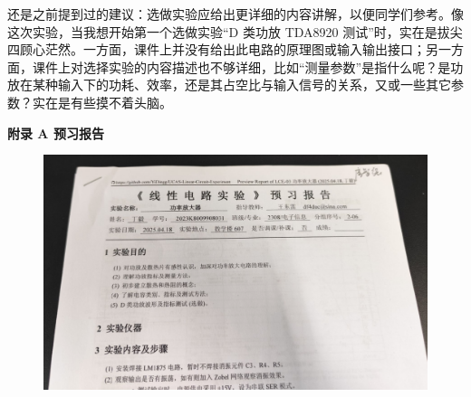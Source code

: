\documentclass[UTF8]{article}
\begin{document}
还是之前提到过的建议：选做实验应给出更详细的内容讲解，以便同学们参考。像这次实验，当我想开始第一个选做实验“D 类功放 TDA8920 测试”时，实在是拔尖四顾心茫然。一方面，课件上并没有给出此电路的原理图或输入输出接口；另一方面，课件上对选择实验的内容描述也不够详细，比如“测量参数”是指什么呢？是功放在某种输入下的功耗、效率，还是其占空比与输入信号的关系，又或一些其它参数？实在是有些摸不着头脑。




















































\newpage
\newpage
\vspace*{\fill}\begin{center}\Huge{\bfseries 
    附录 A\hspace*{20pt} 预习报告
}\end{center} 
\begin{figure}[H]\centering
    \includegraphics[width=\columnwidth]{LCE-03-功率放大器/assets/附录/预习报告.png}
\end{figure}
\vspace*{\fill}
\thispagestyle{fancy} 

\end{document}
